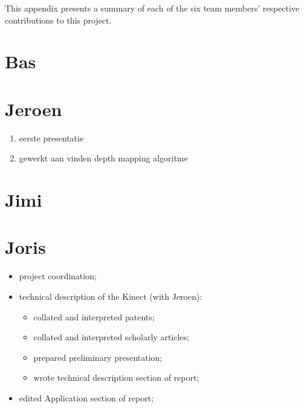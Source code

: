 This appendix presents a summary of each of the six team members' respective
contributions to this project.


\section*{Bas}


\section*{Jeroen}
\begin{enumerate}
\item eerste presentatie
\item gewerkt aan vinden depth mapping algoritme
\end{enumerate}

\section*{Jimi}


\section*{Joris}
\begin{itemize}
    \item project coordination;
    \item technical description of the Kinect (with Jeroen):
    \begin{itemize}
        \item collated and interpreted patents;
        \item collated and interpreted scholarly articles;
        \item prepared preliminary presentation;
        \item wrote technical description section of report;
    \end{itemize}
    \item edited Application section of report;
\end{itemize}


